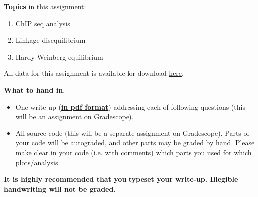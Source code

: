 \noindent 
{\bf Topics} in this assignment: 
\begin{enumerate}
\item ChIP seq analysis
\item Linkage disequilibrium
\item Hardy-Weinberg equilibrium
\end{enumerate}
\vspace{0.2in}


All data for this assignment is available for download \href{https://cmu.box.com/s/3svqmspc8xou4peq00qpab6zlh9elrtj}{here}.
\vspace{0.2in}

\noindent 
{\bf What to hand in}. 
\begin{itemize}
\item One write-up (\underline{\textbf{in pdf format}}) addressing each of following questions (this will be an assignment on Gradescope).
\item All source code (this will be a separate assignment on Gradescope). Parts of your code will be autograded, and other parts may be graded by hand. Please make clear in your code (i.e. with comments) which parts you used for which plots/analysis.
\end{itemize}

\textbf{It is highly recommended that you typeset your write-up. Illegible handwriting will not be graded.}\\

